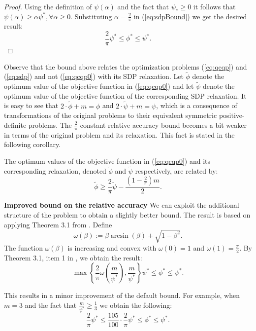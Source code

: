 \begin{proof}
 Using the definition of $\psi\left(\alpha\right)$ and the fact that $\psi_* \geq 0$ it follows that $\psi\left(\alpha\right) \geq \alpha \psi^* ,\forall \alpha \geq 0$. Substituting $\alpha = \frac{2}{\pi}$ in (\ref{eq:sdpBound}) we get the desired result:
 $$\frac{2}{\pi} \psi^* \leq \phi^* \leq \psi^*.$$
\end{proof}


Observe that the bound above relates the optimization problems (\ref{eq:qcqp}) and (\ref{eq:sdp}) and not (\ref{eq:qcqp0}) with its SDP relaxation. Let $\widetilde{\phi}$ denote the optimum value of the objective function in (\ref{eq:qcqp0}) and let $\widetilde{\psi}$ denote the optimum value of the objective function of the corresponding SDP relaxation. It is easy to see that $2 \cdot \widetilde{\phi} + m = \phi$ and $2 \cdot \widetilde{\psi} + m = \psi$, which is a consequence of transformations of the original problems to their equivalent symmetric positive-definite problems. The $\frac{2}{\pi}$ constant relative accuracy bound becomes a bit weaker in terms of the original problem and its relaxation. This fact is stated in the following corollary.
\begin{corollary}
The optimum values of the objective function in (\ref{eq:qcqp0}) and its corresponding relaxation, denoted $\widetilde{\phi}$ and $\widetilde{\psi}$ respectively, are related by:
$$\widetilde{\phi} \geq \frac{2}{\pi} \widetilde{\psi} - \frac{(1 - \frac{2}{\pi}) m}{2}.$$
\end{corollary}


\noindent\textbf{Improved bound on the relative accuracy}
We can exploit the additional structure of the problem to obtain a slightly better bound. The result is based on applying Theorem 3.1 from \cite{Nesterov98globalquadratic}.
%
Define
$$\omega\left(\beta\right) := \beta \arcsin\left(\beta\right) + \sqrt{1 - \beta^2}.$$
The function $\omega\left(\beta\right)$ is increasing and convex with $\omega\left(0\right) = 1$ and $\omega\left(1\right) = \frac{\pi}{2}$.
%
%
By Theorem 3.1, item 1 in \cite{Nesterov98globalquadratic}, we obtain the result:
$$ \max\left\{\frac{2}{\pi}\omega\left(\frac{m}{\psi^*}\right), \frac{m}{\psi^*} \right\}   \psi^* \leq \phi^* \leq \psi^*.$$

This results in a minor improvement of the default bound. For example, when $m = 3$ and the fact that $\frac{m}{\psi^*} \geq \frac{1}{3}$ we obtain the following:
$$ \frac{2}{\pi} \psi^* \leq \frac{105}{100}  \cdot \frac{2}{\pi} \psi^* \leq \phi^* \leq \psi^*.$$

